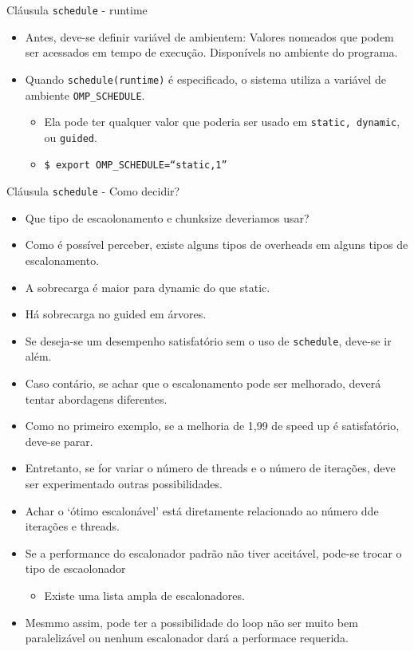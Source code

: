 	\begin{frame}{Cláusula {\tt schedule} - runtime}
		\begin{itemize}
			\item Antes, deve-se definir variável de ambientem: Valores nomeados que podem ser acessados em tempo de execução. Disponívels no ambiente do programa.
			\item Quando {\tt schedule(runtime)} é especificado, o sistema utiliza a variável de ambiente {\tt OMP\_SCHEDULE}.
			\begin{itemize}
				\item Ela pode ter qualquer valor que poderia ser usado em {\tt static, dynamic}, ou {\tt guided}.
				\item {\tt \$ export OMP\_SCHEDULE=``static,1''}
			\end{itemize}
		\end{itemize}
	\end{frame}

	\begin{frame}{Cláusula {\tt schedule} - Como decidir?}
		\begin{itemize}
			\item Que tipo de escaolonamento e chunksize deveriamos usar?
					\bigskip
			\item Como é possível perceber, existe alguns tipos de overheads em alguns tipos de escalonamento.
			\item A sobrecarga é maior para dynamic do que static.
			\item Há sobrecarga no guided em árvores.
					\bigskip
			\item Se deseja-se um desempenho satisfatório sem o uso de {\tt schedule}, deve-se ir além.
			\item Caso contário, se achar que o escalonamento pode ser melhorado, deverá tentar abordagens diferentes.
			\item Como no primeiro exemplo, se a melhoria de 1,99 de speed up é satisfatório, deve-se parar.
			\item Entretanto, se for variar o número de threads e o número de iterações, deve ser experimentado outras possibilidades.
			\item Achar o `ótimo escalonável' está diretamente relacionado ao número dde iterações e threads.
					\bigskip
			\item Se a performance do escalonador padrão não tiver aceitável, pode-se trocar o tipo de escaolonador
			\begin{itemize}
				\item Existe uma lista ampla de escalonadores.
			\end{itemize}
			\item Mesmmo assim, pode ter a possibilidade do loop não ser muito bem paralelizável ou nenhum escalonador dará a performace requerida.
		\end{itemize}
	\end{frame}

